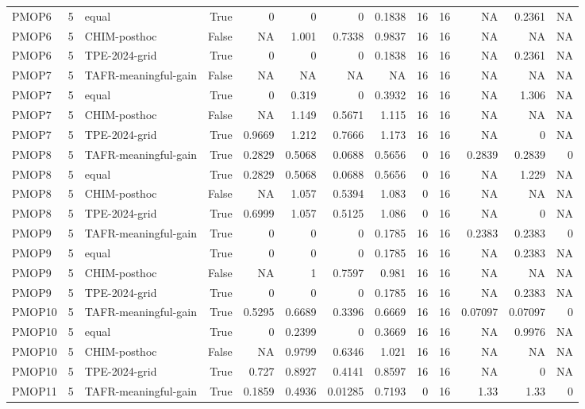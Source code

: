 \begin{tabular}{lrlrrrrrrrrrr}
PMOP6 & 5 & equal & True & 0 & 0 & 0 & 0.1838 & 16 & 16 & NA & 0.2361 & NA \\
PMOP6 & 5 & CHIM-posthoc & False & NA & 1.001 & 0.7338 & 0.9837 & 16 & 16 & NA & NA & NA \\
PMOP6 & 5 & TPE-2024-grid & True & 0 & 0 & 0 & 0.1838 & 16 & 16 & NA & 0.2361 & NA \\
PMOP7 & 5 & TAFR-meaningful-gain & False & NA & NA & NA & NA & 16 & 16 & NA & NA & NA \\
PMOP7 & 5 & equal & True & 0 & 0.319 & 0 & 0.3932 & 16 & 16 & NA & 1.306 & NA \\
PMOP7 & 5 & CHIM-posthoc & False & NA & 1.149 & 0.5671 & 1.115 & 16 & 16 & NA & NA & NA \\
PMOP7 & 5 & TPE-2024-grid & True & 0.9669 & 1.212 & 0.7666 & 1.173 & 16 & 16 & NA & 0 & NA \\
PMOP8 & 5 & TAFR-meaningful-gain & True & 0.2829 & 0.5068 & 0.0688 & 0.5656 & 0 & 16 & 0.2839 & 0.2839 & 0 \\
PMOP8 & 5 & equal & True & 0.2829 & 0.5068 & 0.0688 & 0.5656 & 0 & 16 & NA & 1.229 & NA \\
PMOP8 & 5 & CHIM-posthoc & False & NA & 1.057 & 0.5394 & 1.083 & 0 & 16 & NA & NA & NA \\
PMOP8 & 5 & TPE-2024-grid & True & 0.6999 & 1.057 & 0.5125 & 1.086 & 0 & 16 & NA & 0 & NA \\
PMOP9 & 5 & TAFR-meaningful-gain & True & 0 & 0 & 0 & 0.1785 & 16 & 16 & 0.2383 & 0.2383 & 0 \\
PMOP9 & 5 & equal & True & 0 & 0 & 0 & 0.1785 & 16 & 16 & NA & 0.2383 & NA \\
PMOP9 & 5 & CHIM-posthoc & False & NA & 1 & 0.7597 & 0.981 & 16 & 16 & NA & NA & NA \\
PMOP9 & 5 & TPE-2024-grid & True & 0 & 0 & 0 & 0.1785 & 16 & 16 & NA & 0.2383 & NA \\
PMOP10 & 5 & TAFR-meaningful-gain & True & 0.5295 & 0.6689 & 0.3396 & 0.6669 & 16 & 16 & 0.07097 & 0.07097 & 0 \\
PMOP10 & 5 & equal & True & 0 & 0.2399 & 0 & 0.3669 & 16 & 16 & NA & 0.9976 & NA \\
PMOP10 & 5 & CHIM-posthoc & False & NA & 0.9799 & 0.6346 & 1.021 & 16 & 16 & NA & NA & NA \\
PMOP10 & 5 & TPE-2024-grid & True & 0.727 & 0.8927 & 0.4141 & 0.8597 & 16 & 16 & NA & 0 & NA \\
PMOP11 & 5 & TAFR-meaningful-gain & True & 0.1859 & 0.4936 & 0.01285 & 0.7193 & 0 & 16 & 1.33 & 1.33 & 0 \\

\end{tabular}
